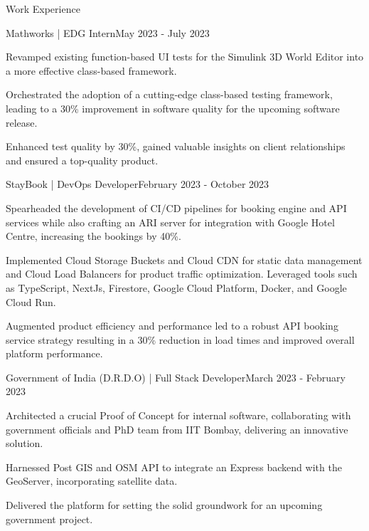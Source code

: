 \documentclass[10pt]{resume}
\begin{document}
    \begin{rSection}{Work Experience}
        \begin{rSubsection}{Mathworks | EDG Intern}{May 2023 - July 2023}
            \item Revamped existing function-based UI tests for the Simulink 3D World Editor into a more effective class-based framework. 
            \item Orchestrated the adoption of a cutting-edge class-based testing framework, leading to a 30\% improvement in software quality for the upcoming software release. 
            \item Enhanced test quality by 30\%, gained valuable insights on client relationships and ensured a top-quality product.
        \end{rSubsection}
    

        \begin{rSubsection}{StayBook | DevOps Developer}{February 2023 - October 2023}
            \item Spearheaded the development of CI/CD pipelines for booking engine and API services while also crafting an ARI server for integration with Google Hotel Centre, increasing the bookings by 40\%. 
            \item Implemented Cloud Storage Buckets and Cloud CDN for static data management and Cloud Load Balancers for product traffic optimization. Leveraged tools such as TypeScript, NextJs, Firestore, Google Cloud Platform, Docker, and Google Cloud Run.
            \item Augmented product efficiency and performance led to a robust API booking service strategy resulting in a 30\% reduction in load times and improved overall platform performance.
        \end{rSubsection}

    
        \begin{rSubsection}{Government of India (D.R.D.O) | Full Stack Developer}{March 2023 - February 2023}
            \item Architected a crucial Proof of Concept for internal software, collaborating with government officials and PhD team from IIT Bombay, delivering an innovative solution. 
            \item Harnessed Post GIS and OSM API to integrate an Express backend with the GeoServer, incorporating satellite data.
            \item Delivered the platform for setting the solid groundwork for an upcoming government project.
        \end{rSubsection}
    

\end{rSection}
\end{document}
